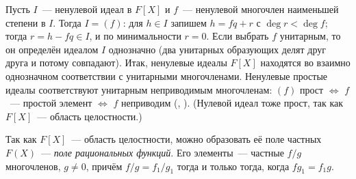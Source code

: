 \begin{remark}[1.9]
Пусть $I$~--- ненулевой идеал в $F[X]$ и $f$~--- ненулевой многочлен наименьшей степени в $I$. Тогда $I=(f)$: для
$h\in I$ запишем $h=fq+r$ с $\deg r<\deg f$; тогда $r=h-fq\in I$, и по минимальности $r=0$. Если выбрать $f$ унитарным,
то он определён идеалом $I$ однозначно (два унитарных образующих делят друг друга и потому совпадают). Итак, ненулевые
идеалы $F[X]$ находятся во взаимно однозначном соответствии с унитарными многочленами. Ненулевые простые идеалы
соответствуют унитарным неприводимым многочленам: $(f)$ прост $\iff$ $f$~--- простой элемент $\iff$ $f$ неприводим
(, ). (Нулевой идеал тоже прост, так как $F[X]$~--- область целостности.)
\end{remark}

\begin{remark}[1.10]
Так как $F[X]$~--- область целостности, можно образовать её поле частных $F(X)$~--- \emph{поле рациональных функций}.
Его элементы~--- частные $f/g$ многочленов, $g\ne0$, причём $f/g=f_1/g_1$ тогда и только тогда, когда $fg_1=f_1g$.
\end{remark}
